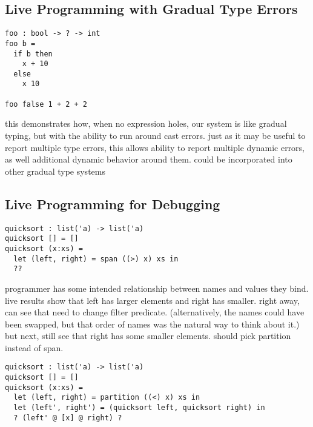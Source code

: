 \subsection{Live Programming with Gradual Type Errors}



\begin{lstlisting}
foo : bool -> ? -> int
foo b =
  if b then
    x + 10
  else
    x 10

foo false 1 + 2 + 2
\end{lstlisting}

this demonstrates how, when no expression holes, our system is like gradual
typing, but with the ability to run around cast errors.
%
just as it may be useful to report multiple type errors, this allows ability to
report multiple dynamic errors, as well additional dynamic behavior around them.
%
could be incorporated into other gradual type systems


\subsection{Live Programming for Debugging}




\begin{lstlisting}
quicksort : list('a) -> list('a)
quicksort [] = []
quicksort (x:xs) =
  let (left, right) = span ((>) x) xs in
  ??
\end{lstlisting}

programmer has some intended relationship between names and values they bind.
%
live results show that left has larger elements and right has smaller.
%
right away, can see that need to change filter predicate. (alternatively, the
names could have been swapped, but that order of names was the natural way
to think about it.)
%
but next, still see that right has some smaller elements.
%
should pick partition instead of span.

\begin{lstlisting}
quicksort : list('a) -> list('a)
quicksort [] = []
quicksort (x:xs) =
  let (left, right) = partition ((<) x) xs in
  let (left', right') = (quicksort left, quicksort right) in
  ? (left' @ [x] @ right) ?
\end{lstlisting}

